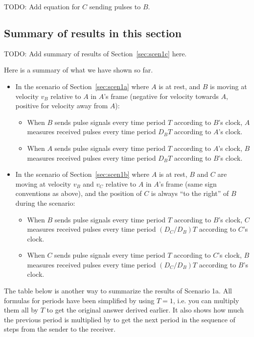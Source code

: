 \documentclass[a4paper]{article}
\theoremstyle{plain}
\theoremstyle{definition}
\begin{document}
TODO: Add equation for $C$ sending pulses to $B$.


\subsection{Summary of results in this section}
\label{sec:summary}

TODO: Add summary of results of Section~\ref{sec:scen1c} here.

Here is a summary of what we have shown so far.

\begin{itemize}
\item In the scenario of Section~\ref{sec:scen1a} where $A$ is at rest,
  and $B$ is moving at velocity $v_B$ relative to $A$ in $A$'s frame
  (negative for velocity towards $A$, positive for velocity away from
  $A$):
  \begin{itemize}
    \item When $B$ sends pulse signals every time period $T$ according
      to $B$'s clock, $A$ measures received pulses every time period
      $D_B T$ according to $A$'s clock.
    \item When $A$ sends pulse signals every time period $T$ according
      to $A$'s clock, $B$ measures received pulses every time period
      $D_B T$ according to $B$'s clock.
  \end{itemize}
\item In the scenario of Section~\ref{sec:scen1b} where $A$ is at rest,
  $B$ and $C$ are moving at velocity $v_B$ and $v_C$ relative to $A$
  in $A$'s frame (same sign conventions as above), and the position of
  $C$ is always ``to the right'' of $B$ during the scenario:
  \begin{itemize}
    \item When $B$ sends pulse signals every time period $T$ according
      to $B$'s clock, $C$ measures received pulses every time period
      $(D_C/D_B) T$ according to $C$'s clock.
    \item When $C$ sends pulse signals every time period $T$ according
      to $C$'s clock, $B$ measures received pulses every time period
      $(D_C/D_B) T$ according to $B$'s clock.
  \end{itemize}
\end{itemize}

The table below is another way to summarize the results of Scenario 1a.
All formulas for periods have been simplified by using $T=1$, i.e. you
can multiply them all by $T$ to get the original answer derived
earlier.  It also shows how much the previous period is multiplied by
to get the next period in the sequence of steps from the sender to the
receiver.
\end{document}

